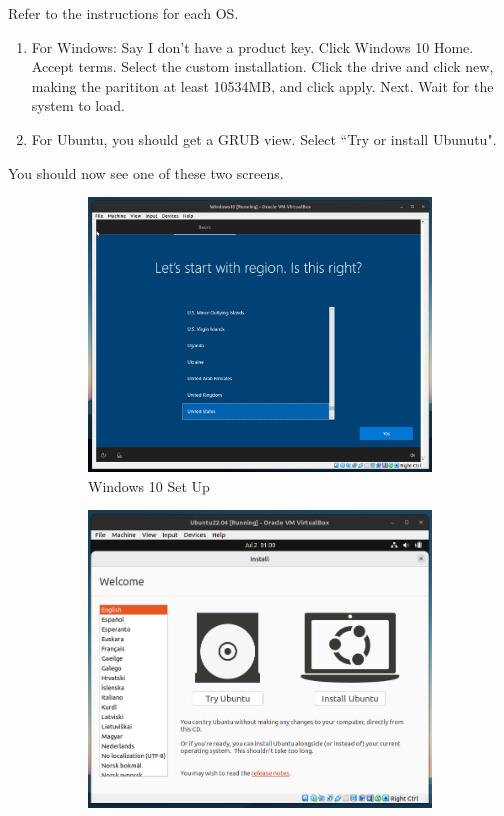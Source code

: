 \documentclass{article}
\begin{document}
  Refer to the instructions for each OS. 
  \begin{enumerate}
      \item For Windows: Say I don't have a product key. Click Windows 10 Home. Accept terms. Select the custom installation. Click the drive and click new, making the parititon at least 10534MB, and click apply. Next. Wait for the system to load. 
      \item For Ubuntu, you should get a GRUB view. Select ``Try or install Ubunutu". 
  \end{enumerate}
  You should now see one of these two screens. 
  \begin{figure}[hbt!]
      \centering 
      \begin{subfigure}[b]{0.45\textwidth}
      \centering
          \includegraphics[width=\textwidth]{img/VM_Windows2.png}
          \caption{Windows 10 Set Up}
          \label{fig:VM_Windows2}
      \end{subfigure}
      \hfill 
      \begin{subfigure}[b]{0.45\textwidth}
      \centering
          \includegraphics[width=\textwidth]{img/VM_Ubuntu2.png}

\end{subfigure}
\end{figure}
\end{document}
